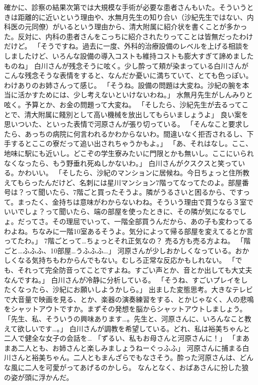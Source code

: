 確かに、診察の結果次第では大規模な手術が必要な患者さんもいた。そういうときは距離的に近いという理由や、水無月先生の知り合い（沙紀先生ではない、内科医の元同僚）がいるという理由から、清大附属に紹介状を書くことが多かった。反対に、内科の患者さんをこっちに紹介されたりってことは皆無だったわけだけど。
「そうですね。過去に一度、外科的治療設備のレベルを上げる相談をしましたけど、いろんな設備の導入コストも維持コストも膨大すぎて諦めましたものね」
白川さんが残念そうに呟く。少し酔って頬が染まっている白川さんがこんな残念そうな表情をすると、なんだか憂いに満ちていて、とても色っぽい。わけありのお姉さんって感じ。
「そうね。設備の問題は大変ね。沙紀の腕を本当に活かすためには、少し考えないといけないわね。」
水無月先生がしんみりと呟く。予算とか、お金の問題って大変ね。
「そしたら、沙紀先生が去るってことで、清大附属に餞別として高い機械を放出してもらいましょうよ」
良い案を思いついた、といった表情で河原さんが張り切っている。
「そんなこと要求したら、あっちの病院に何言われるかわからないわ。間違いなく拒否されるし、下手するとここの寮だって追い出されちゃうかもよ。」
「あ、それはなし。ここ、地味に駅にも近いし。どこぞの学生寮みたいに門限とかも無いし。ここにいられなくなったら、もう野垂れ死ぬしかないわ。」
白川さんがクスクスと笑っている。かわいい。
「そしたら、沙紀のマンションに居候ね。今日ちょっと住所教えてもらったんだけど、名刺には星川マンション7階ってなってたのよ。部屋番号は？って聞いたら、7階ごと買ったそうよ。隣がうるさいと困るから、ですって。まったく、金持ちは意味がわからないわね。そういう理由で買うなら３室でいいでしょ？って聞いたら、端の部屋を使ったときに、その隣が気になるでしょ。だってさ。その理屈でいって、一階全部買うんだから、あの子も変わってるわよね。ちなみに一階10室あるそうよ。気分によって帰る部屋を変えてるとか言ってたわ。」
7階ごとって…ちょっとそれ正気なの？ 売る方も売る方よね。
「階ごと…ふふふ、10部屋…うふふふ…」
河原さんが少しおかしくなっている。おかしくなる気持ちもわからんでもない。むしろ正常な反応かもしれない。
「でも、それって完全防音ってことですよね。すごい声とか、音とか出しても大丈夫なんですね。」
白川さんが冷静に分析している。
「そうね、すごいプレイをしたくなったら、沙紀にお願いしようかしら。」
出ました変態思考。大きなテレビで大音量で映画を見る、とか、楽器の演奏練習をする、とかじゃなく、人の悲鳴をシャットアウトですか。まずその発想を脳からシャットアウトしましょう。
「先生、私、そういうの興味あります…。先生と、河原さんに、いろんなこと教えて欲しいです…。」
白川さんが調教を希望している。どれ、私は裕美ちゃんと二人で健全な女子の会話を…
「ずるい、私もお母さんと河原さんに！」
「まあまあ二人とも、お姉さんと楽しみましょうねーぐっふふ」
河原さんに捕まる白川さんと裕美ちゃん。二人ともまんざらでもなさそう。酔った河原さんは、どんな風に二人を可愛がってあげるのかしら。
なんとなく、おばあさんに扮した狼の姿が頭に浮かんだ。


